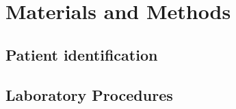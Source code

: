 \chapter{Materials and Methods}

\section{Patient identification}




\section{Laboratory Procedures}
